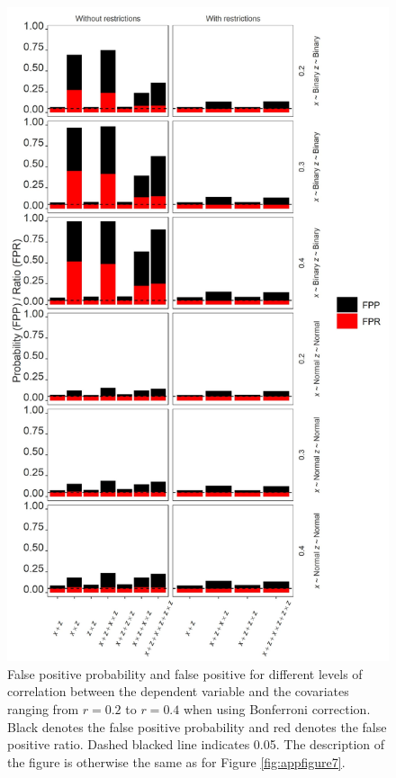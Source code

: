 \begin{landscape}
\begin{figure}[hbt!]
\includegraphics[scale=0.7]{R/Analysis/Result/Figures/Figure2SIBon.jpeg}
\centering
\caption{False positive probability and false positive for different levels of correlation between the dependent variable and the covariates ranging from  $\textit{r}=0.2$ to  $\textit{r}=0.4$ when using Bonferroni correction. Black denotes the false positive probability and red denotes the false positive ratio. Dashed blacked line indicates 0.05. The description of the figure is otherwise the same as for Figure \ref{fig:appfigure7}.}
\label{fig:appfigure8}
\end{figure}
\end{landscape}



